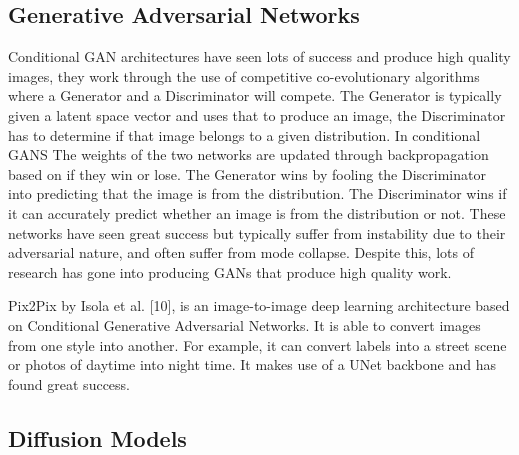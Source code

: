 \documentclass{UoYCSproject}
\begin{document}
\subsection{Generative Adversarial Networks}





Conditional GAN architectures have seen lots of success and produce high quality images, they work through the use of competitive co-evolutionary algorithms where a Generator and a Discriminator will compete. The Generator is typically given a latent space vector and uses that to produce an image, the Discriminator has to determine if that image belongs to a given distribution. In conditional GANS The weights of the two networks are updated through backpropagation based on if they win or lose. The Generator wins by fooling the Discriminator into predicting that the image is from the distribution. The Discriminator wins if it can accurately predict whether an image is from the distribution or not. These networks have seen great success but typically suffer from instability due to their adversarial nature, and often suffer from mode collapse. Despite this, lots of research has gone into producing GANs that produce high quality work.  

Pix2Pix by Isola et al. [10], is an image-to-image deep learning architecture based on Conditional Generative Adversarial Networks. It is able to convert images from one style into another. For example, it can convert labels into a street scene or photos of daytime into night time. It makes use of a UNet backbone and has found great success. 
\subsection{Diffusion Models}

\end{document}
